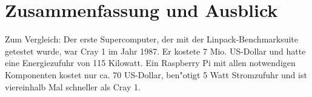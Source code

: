 \chapter{Zusammenfassung und Ausblick}\label{Kapitel 5}


Zum Vergleich: Der erste Supercomputer, der mit der Linpack-Benchmarksuite getestet wurde, war Cray 1 im Jahr 1987. Er kostete 7 Mio. US-Dollar und hatte eine Energiezufuhr von 115 Kilowatt. Ein Raspberry Pi mit allen notwendigen Komponenten kostet nur ca. 70 US-Dollar, ben"otigt 5 Watt Stromzufuhr und ist viereinhalb Mal schneller als Cray 1. 


\endinput 

